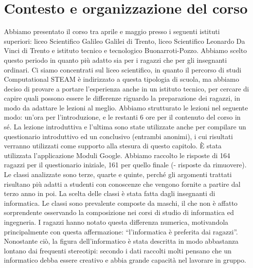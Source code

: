 \section{Contesto e organizzazione del corso}
Abbiamo presentato il corso tra aprile e maggio presso i seguenti istituti superiori: liceo Scientifico Galileo Galilei di Trento, liceo Scientifico Leonardo Da Vinci di Trento e istituto tecnico e tecnologico Buonarroti-Pozzo. Abbiamo scelto questo periodo in quanto più adatto sia per i ragazzi che per gli insegnanti ordinari. Ci siamo concentrati sul liceo scientifico, in quanto il percorso di studi Computational STEAM è indirizzato a questa tipologia di scuola, ma abbiamo deciso di provare a portare l’esperienza anche in un istituto tecnico, per cercare di capire quali possono essere le differenze riguardo la preparazione dei ragazzi, in modo da adattare le lezioni al meglio. Abbiamo strutturato le lezioni nel seguente modo: un’ora per l’introduzione, e le restanti 6 ore per il contenuto del corso in sé. La lezione introduttiva e l’ultima sono state utilizzate anche per compilare un questionario introduttivo ed un conclusivo (entrambi anonimi), i cui risultati verranno utilizzati come supporto alla stesura di questo capitolo. È stata utilizzata l’applicazione Moduli Google. Abbiamo raccolto le risposte di 164 ragazzi per il questionario iniziale, 161 per quello finale (- risposte da rimuovere).
Le classi analizzate sono terze, quarte e quinte, perché gli argomenti trattati risultano più adatti a studenti con conoscenze che vengono fornite a partire dal terzo anno in poi. La scelta delle classi è stata fatta dagli insegnanti di informatica. 
Le classi sono prevalente composte da maschi, il che non è affatto sorprendente osservando la composizione nei corsi di studio di informatica ed ingegneria. I ragazzi hanno notato questa differenza numerica, motivandola principalmente con questa affermazione: “l'informatica è preferita dai ragazzi”. Nonostante ciò, la figura dell’informatico è stata descritta in modo abbastanza lontano dai frequenti stereotipi: secondo i dati raccolti molti pensano che un informatico debba essere creativo e abbia grande capacità nel lavorare in gruppo. 

